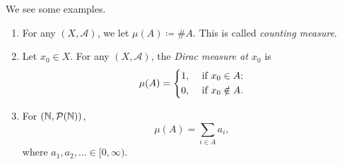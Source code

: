 \begin{eg}
	We see some examples.
	\begin{enumerate}
		\item\label{eg:counting-measure} For any \((X, \mathcal{A})\), we let \(\mu(A) \coloneqq \# A\). This is called \emph{counting measure}.
		\item Let \(x_0\in X\). For any \((X, \mathcal{A})\), the \emph{Dirac measure at \(x_0\)} is
		      \[
			      \mu(A) = \begin{dcases}
				      1, & \text{ if } x_0\in A;    \\
				      0, & \text{ if } x_0\notin A.
			      \end{dcases}
		      \]
		\item For \((\mathbb{\MakeUppercase{N}}, \mathcal{P} (\mathbb{\MakeUppercase{N}} ))\),
		      \[
			      \mu(A) = \sum\limits_{i\in A}a_{i},
		      \]
		      where \(a_1, a_2, \ldots \in [0, \infty) \).
	\end{enumerate}
\end{eg}



